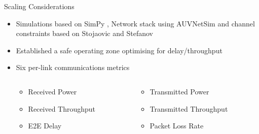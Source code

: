 \documentclass[aspectratio=169]{beamer}
\begin{document}
\begin{frame}[label=scaling]{Scaling Considerations}
  \begin{itemize}
    \item Simulations based on SimPy \autocite{Mueller2003SimPy}, Network stack using AUVNetSim \autocite{Miquel2008} and channel constraints based on Stojaovic and Stefanov \autocite{Stojanovic2007,Stefanov2011}\hyperlink{tab:sysconstraints}{}
      \pause
    \item Established a safe operating zone optimising for delay/throughput  \hyperlink{eq:networkeffects}{}
    \item Six per-link communications metrics
      \pause
      \begin{columns}
        \begin{column}{0.5\textwidth}
          \begin{itemize}
            \item Received Power
            \item Received Throughput
            \item E2E Delay
          \end{itemize}
        \end{column}
        \begin{column}{0.5\textwidth}
          \begin{itemize}
            \item Transmitted Power
            \item Transmitted Throughput
            \item Packet Loss Rate
          \end{itemize}
        \end{column}
      \end{columns}
  \end{itemize}

\end{frame}
\end{document}
